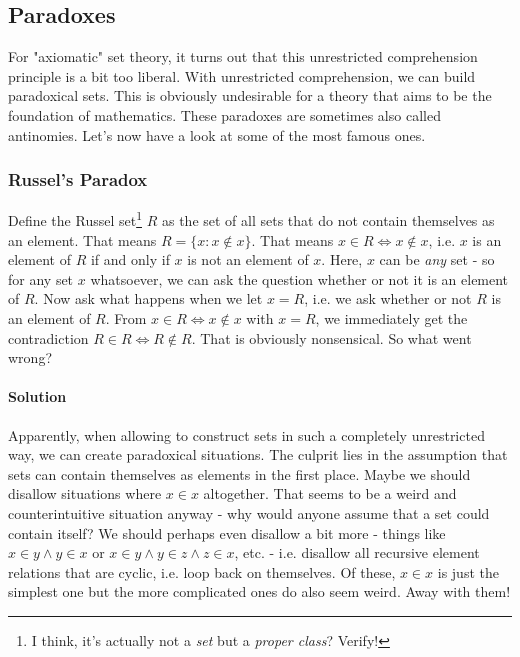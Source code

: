 \subsection{Paradoxes}
For "axiomatic" set theory, it turns out that this unrestricted comprehension principle is a bit too liberal. With unrestricted comprehension, we can build paradoxical sets. This is obviously undesirable for a theory that aims to be the foundation of mathematics. These paradoxes are sometimes also called antinomies. Let's now have a look at some of the most famous ones.

\subsubsection{Russel's Paradox}
Define the Russel set\footnote{I think, it's actually not a \emph{set} but a \emph{proper class}? Verify!} $R$ as the set of all sets that do not contain themselves as an element. That means $R = \{x: x \notin x\}$. That means $x \in R \Leftrightarrow x \notin x$, i.e. $x$ is an element of $R$ if and only if $x$ is not an element of $x$. Here, $x$ can be \emph{any} set - so for any set $x$ whatsoever, we can ask the question whether or not it is an element of $R$. Now ask what happens when we let $x = R$, i.e. we ask whether or not $R$ is an element of $R$. From $x \in R \Leftrightarrow x \notin x$ with $x = R$, we immediately get the contradiction $R \in R \Leftrightarrow R \notin R$. That is obviously nonsensical. So what went wrong?

\paragraph{Solution} Apparently, when allowing to construct sets in such a completely unrestricted way, we can create paradoxical situations. The culprit lies in the assumption that sets can contain themselves as elements in the first place. Maybe we should disallow situations where $x \in x$ altogether. That seems to be a weird and counterintuitive situation anyway - why would anyone assume that a set could contain itself? We should perhaps even disallow a bit more - things like $x \in y \wedge y \in x$ or $x \in y \wedge y \in z \wedge z \in x$, etc. - i.e. disallow all recursive element relations that are cyclic, i.e. loop back on themselves. Of these, $x \in x$ is just the simplest one but the more complicated ones do also seem weird. Away with them!

